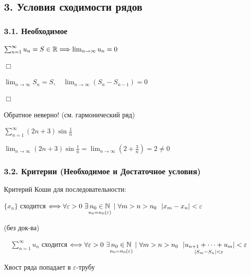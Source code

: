 \documentclass[12pt]{article}
\begin{document}
    \mediumvspace

    \subsection{3. Условия сходимости рядов}

    \subsubsection{3.1. Необходимое}

    \begin{MyTheorem}
        \Ths $\sum_{n = 1}^\infty u_n = S \in \mathbb{R} \Longrightarrow \lim_{n \to \infty} u_n = 0$
    \end{MyTheorem}

    \begin{tcolorbox}
        $\Box$

        $\lim_{n \to \infty} S_n = S, \quad \lim_{n\to\infty} (S_n - S_{n - 1}) = 0$

        $\Box$
    \end{tcolorbox}

    \Nota Обратное неверно! (см. гармонический ряд)

    \Ex $\sum_{n = 1}^\infty (2n + 3) \sin \frac{1}{n}$

    $\lim_{n \to \infty} (2n + 3) \sin \frac{1}{n} = \lim_{n \to \infty} (2 + \frac{3}{n}) = 2 \neq 0$

    \subsubsection{3.2. Критерии (Необходимое и Достаточное условия)}

    \Mem Критерий Коши для последовательности: 
    
    $\{x_n\}$ сходится $\Longleftrightarrow \forall \varepsilon > 0 \ \exists \underset{n_0 = n_0 (\varepsilon)}{n_0 \in \mathbb{N}} \ | \ \forall m > n > n_0 \ \ |x_m - x_n| < \varepsilon$

    \begin{MyTheorem}
        \Ths (без док-ва) 
        
        $\quad \sum_{n = 1}^\infty u_n$ сходится $\Longleftrightarrow \forall \varepsilon > 0 \ \exists \underset{n_0 = n_0 (\varepsilon)}{n_0 \in \mathbb{N}} \ | \ \forall m > n > n_0 \ \ \underset{|S_m - S_n| < \varepsilon}{|u_{n + 1} + \dots + u_m|} < \varepsilon$
    \end{MyTheorem}

    \Nota Хвост ряда попадает в $\varepsilon$-трубу
\end{document}
